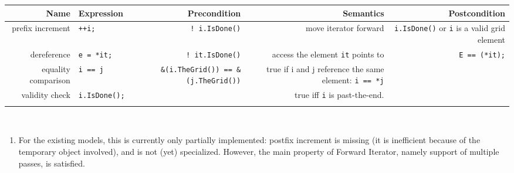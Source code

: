    

\begin{tabularx}{15cm}{RlRRR} \\
  \hline
  \bf  Name     &
  \bf  Expression &
  \bf  Precondition&
  \bf  Semantics &
  \bf  Postcondition
  \\ 
  \hline
  prefix increment  &
  {\tt ++i;} &
  {\tt ! i.IsDone()} &
  move iterator forward  & 
  {\tt i.IsDone()} or {\tt *i} is a valid grid element 
  \\ 
  dereference  &
  {\tt e = *it;} & 
  {\tt ! it.IsDone()} &  
  access the element {\tt it} points to &
  {\tt E == (*it);} 
  \\ 
  equality comparison  &
  {\tt i == j} & 
  {\tt \&(i.TheGrid()) == \&(j.TheGrid())} &  
  true if i and j reference the same element:  {\tt *i == *j}  &
  ~ 
  \\ 
  validity check  &
  {\tt i.IsDone();} & 
  ~ &  
  true iff {\tt i} is past-the-end. &
  ~ 
  \\ 
  \hline
  \\
\end{tabularx}

\W{}

\\
    
\W{}

\begin{enumerate}
\item 
  For the existing models, this is currently only partially implemented: postfix increment is missing
  (it is inefficient because of the temporary object involved), and
  is not (yet) specialized.
  However, the main property of Forward Iterator, namely support of multiple passes,
  is satisfied.
\end{enumerate}

 ~
 ~

  


